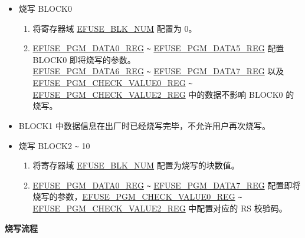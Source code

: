 \documentclass[main\_\_CN.tex]{subfiles}
\begin{document}
\begin{itemize}
    \item 烧写 BLOCK0
    \begin{enumerate}
        \item 将寄存器域 \hyperref[fielddesc:EFUSEBLKNUM]{EFUSE\_BLK\_NUM} 配置为 0。
        \item \hyperref[regdesc:EFUSEPGMDATANREG]{EFUSE\_PGM\_DATA0\_REG} \verb+~+ \hyperref[regdesc:EFUSEPGMDATANREG]{EFUSE\_PGM\_DATA5\_REG} 配置 BLOCK0 即将烧写的参数。\\
        \hyperref[regdesc:EFUSEPGMDATANREG]{EFUSE\_PGM\_DATA6\_REG} \verb+~+ \hyperref[regdesc:EFUSEPGMDATANREG]{EFUSE\_PGM\_DATA7\_REG} 以及\\ \hyperref[regdesc:EFUSEPGMCHECKVALUEMREG]{EFUSE\_PGM\_CHECK\_VALUE0\_REG} \verb+~+ \hyperref[regdesc:EFUSEPGMCHECKVALUEMREG]{EFUSE\_PGM\_CHECK\_VALUE2\_REG} 中的数据不影响 BLOCK0 的烧写。
    \end{enumerate}
    \item BLOCK1 中数据信息在出厂时已经烧写完毕，不允许用户再次烧写。
    \item 烧写 BLOCK2 \verb+~+ 10
    \begin{enumerate}
        \item 将寄存器域 \hyperref[fielddesc:EFUSEBLKNUM]{EFUSE\_BLK\_NUM} 配置为烧写的块数值。
        \item \hyperref[regdesc:EFUSEPGMDATANREG]{EFUSE\_PGM\_DATA0\_REG} \verb+~+ \hyperref[regdesc:EFUSEPGMDATANREG]{EFUSE\_PGM\_DATA7\_REG} 配置即将烧写的参数，\hyperref[regdesc:EFUSEPGMCHECKVALUEMREG]{EFUSE\_PGM\_CHECK\_VALUE0\_REG}  \verb+~+ \hyperref[regdesc:EFUSEPGMCHECKVALUEMREG]{EFUSE\_PGM\_CHECK\_VALUE2\_REG} 中配置对应的 RS 校验码。
    \end{enumerate}
\end{itemize}

{\bfseries 烧写流程}
\end{document}
